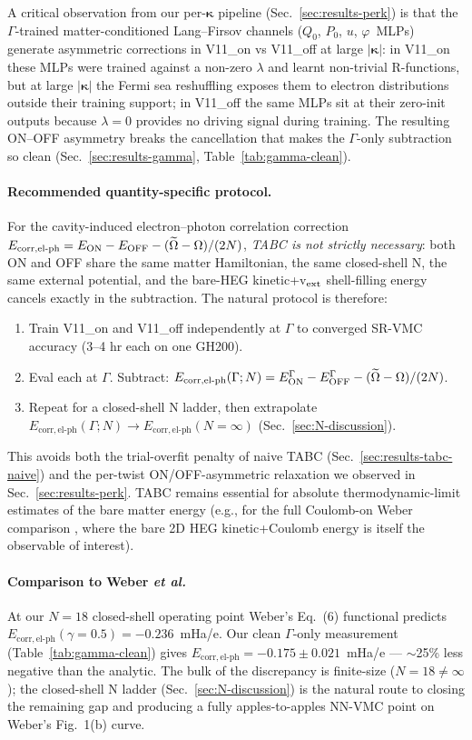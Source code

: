 \documentclass[reprint,amsmath,amssymb,aps,prb,floatfix,nofootinbib]{revtex4-2}
\newcommand{\Ehp}{E_{\mathrm{corr},\mathrm{el}\text{-}\mathrm{ph}}}
\newcommand{\Oeff}{\widetilde{\Omega}}
\begin{document}
A critical observation from our per-$\bm\kappa$ pipeline
(Sec.~\ref{sec:results-perk}) is that the $\Gamma$-trained
matter-conditioned Lang--Firsov channels ($Q_0$, $P_0$, $u$,
$\varphi$~MLPs) generate asymmetric corrections in V11\_on vs
V11\_off at large $|\bm\kappa|$: in V11\_on these MLPs were trained
against a non-zero $\lambda$ and learnt non-trivial
R-functions, but at large $|\bm\kappa|$ the Fermi sea reshuffling
exposes them to electron distributions outside their training
support; in V11\_off the same MLPs sit at their zero-init outputs
because $\lambda = 0$ provides no driving signal during training.
The resulting ON--OFF asymmetry breaks the cancellation that makes
the $\Gamma$-only subtraction so clean (Sec.~\ref{sec:results-gamma},
Table~\ref{tab:gamma-clean}).

\paragraph{Recommended quantity-specific protocol.}
For the cavity-induced electron--photon correlation correction
$\Ehp = E_{\rm ON} - E_{\rm OFF} - (\Oeff - \Omega)/(2N)$,
\emph{TABC is not strictly necessary}: both ON and OFF share the
same matter Hamiltonian, the same closed-shell N, the same external
potential, and the bare-HEG kinetic+v$_{\rm ext}$ shell-filling
energy cancels exactly in the subtraction.  The natural protocol
is therefore:
\begin{enumerate}
\item Train V11\_on and V11\_off independently at $\Gamma$ to
      converged SR-VMC accuracy (3--4 hr each on one GH200).
\item Eval each at $\Gamma$.  Subtract: $\Ehp(\Gamma; N) =
      E_{\rm ON}^\Gamma - E_{\rm OFF}^\Gamma - (\Oeff - \Omega)/(2N)$.
\item Repeat for a closed-shell N ladder, then extrapolate
      $\Ehp(\Gamma; N) \to \Ehp(N{=}\infty)$ (Sec.~\ref{sec:N-discussion}).
\end{enumerate}
This avoids both the trial-overfit penalty of naive TABC
(Sec.~\ref{sec:results-tabc-naive}) and the per-twist
ON/OFF-asymmetric relaxation we observed in
Sec.~\ref{sec:results-perk}.  TABC remains essential for absolute
thermodynamic-limit estimates of the bare matter energy (e.g.,
for the full Coulomb-on Weber comparison
\cite{Weber2024}, where the bare 2D HEG kinetic+Coulomb energy is
itself the observable of interest).

\paragraph{Comparison to Weber \emph{et al.}}
At our $N=18$ closed-shell operating point Weber's Eq.~(6)
functional predicts $\Ehp(\gamma{=}0.5) = -0.236$~mHa/e.  Our clean
$\Gamma$-only measurement (Table~\ref{tab:gamma-clean}) gives
$\Ehp = -0.175 \pm 0.021$~mHa/e --- $\sim$25\% less negative than
the analytic.  The bulk of the discrepancy is finite-size
($N=18 \neq \infty$); the closed-shell N ladder
(Sec.~\ref{sec:N-discussion}) is the natural route to closing the
remaining gap and producing a fully apples-to-apples NN-VMC point
on Weber's Fig.~1(b) curve.
\end{document}
